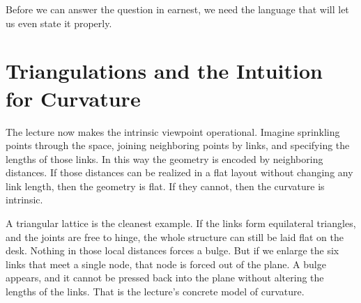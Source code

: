 Before we can answer the question in earnest, we need the language that will let us even state it properly.

\section{Triangulations and the Intuition for Curvature}

The lecture now makes the intrinsic viewpoint operational. Imagine sprinkling points through the space, joining neighboring points by links, and specifying the lengths of those links. In this way the geometry is encoded by neighboring distances. If those distances can be realized in a flat layout without changing any link length, then the geometry is flat. If they cannot, then the curvature is intrinsic.

A triangular lattice is the cleanest example. If the links form equilateral triangles, and the joints are free to hinge, the whole structure can still be laid flat on the desk. Nothing in those local distances forces a bulge. But if we enlarge the six links that meet a single node, that node is forced out of the plane. A bulge appears, and it cannot be pressed back into the plane without altering the lengths of the links. That is the lecture's concrete model of curvature.


